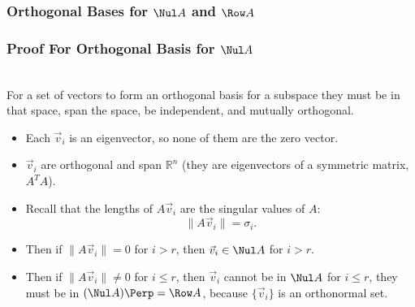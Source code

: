 \begin{frame}\frametitle{Orthogonal Bases for $\Nul A$ and $\Row A$}

    \begin{center}\end{center}

\end{frame}

\begin{frame}\frametitle{Proof For Orthogonal Basis for $\Nul A$}

    \\ 
    For a set of vectors to form an orthogonal basis for a subspace they must be in that space, span the space, be independent, and mutually orthogonal.
    \begin{itemize}
        \item<2-> Each $\vec v_i$ is an eigenvector, so none of them are the zero vector. 
        \item<3-> $\vec v_i$ are orthogonal and span $\mathbb R^n$ (they are eigenvectors of a symmetric matrix, $A^TA$).
        \item<4-> Recall that the lengths of $A\vec v_i$ are the singular values of $A$:
        $$\lVert A\vec v_i \rVert = \sigma _i.$$ 
        \item<5-> Then if $\lVert A\vec v_i \rVert =  0$ for $i > r$, then $\vec v_i \in \Nul A$ for $i > r$.
        \item<6-> Then if $\lVert A\vec v_i \rVert \ne  0$ for $i \le r$, then $\vec v_i $ cannot be in $\Nul A$ for $i \le r$, they must be in $(\Nul A)\Perp = \Row A$, because $\{\vec v_i\}$ is an orthonormal set. 
    \end{itemize}

\end{frame}

